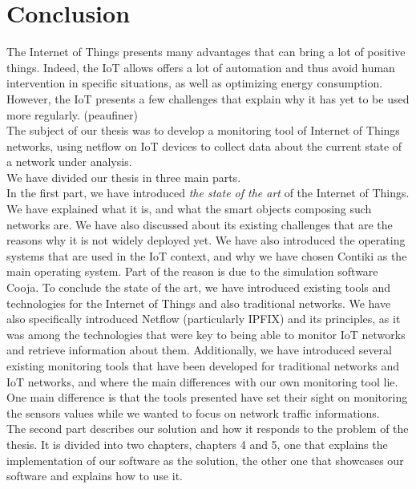\chapter*{Conclusion}

The Internet of Things presents many advantages that can bring a lot of positive things. Indeed, the IoT allows offers a lot of automation and thus avoid human intervention in specific situations, as well as optimizing energy consumption. However, the IoT presents a few challenges that explain why it has yet to be used more regularly. (peaufiner)\\

The subject of our thesis was to develop a monitoring tool of Internet of Things networks, using netflow on IoT devices to collect data about the current state of a network under analysis.\\

We have divided our thesis in three main parts.\\

In the first part, we have introduced \textit{the state of the art} of the Internet of Things. We have explained what it is, and what the smart objects composing such networks are. We have also discussed about its existing challenges that are the reasons why it is not widely deployed yet. We have also introduced the operating systems that are used in the IoT context, and why we have chosen Contiki as the main operating system. Part of the reason is due to the simulation software Cooja. To conclude the state of the art, we have introduced existing tools and technologies for the Internet of Things and also traditional networks. We have also specifically introduced Netflow (particularly IPFIX) and its principles, as it was among the technologies that were key to being able to monitor IoT networks and retrieve information about them. Additionally, we have introduced several existing monitoring tools that have been developed for traditional networks and IoT networks, and where the main differences with our own monitoring tool lie. One main difference is that the tools presented have set their sight on monitoring the sensors values while we wanted to focus on network traffic informations.\\

The second part describes our solution and how it responds to the problem of the thesis. It is divided into two chapters, chapters 4 and 5, one that explains the implementation of our software as the solution, the other one that showcases our software and explains how to use it.\\

